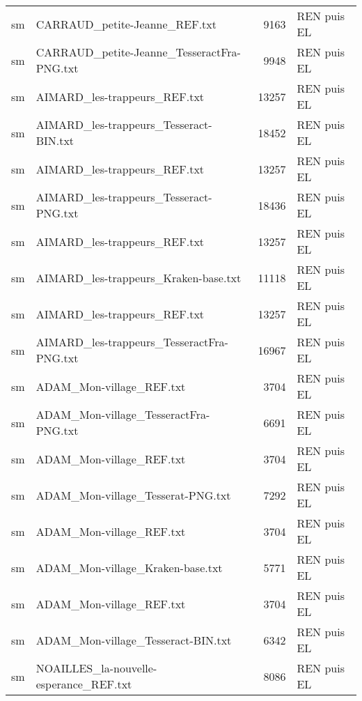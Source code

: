 \begin{tabular}{llrl}
    sm &                      CARRAUD\_petite-Jeanne\_REF.txt &                  9163 & REN puis EL \\
    sm &         CARRAUD\_petite-Jeanne\_TesseractFra-PNG.txt &                  9948 & REN puis EL \\
    sm &                       AIMARD\_les-trappeurs\_REF.txt &                 13257 & REN puis EL \\
    sm &             AIMARD\_les-trappeurs\_Tesseract-BIN.txt &                 18452 & REN puis EL \\
    sm &                       AIMARD\_les-trappeurs\_REF.txt &                 13257 & REN puis EL \\
    sm &             AIMARD\_les-trappeurs\_Tesseract-PNG.txt &                 18436 & REN puis EL \\
    sm &                       AIMARD\_les-trappeurs\_REF.txt &                 13257 & REN puis EL \\
    sm &               AIMARD\_les-trappeurs\_Kraken-base.txt &                 11118 & REN puis EL \\
    sm &                       AIMARD\_les-trappeurs\_REF.txt &                 13257 & REN puis EL \\
    sm &          AIMARD\_les-trappeurs\_TesseractFra-PNG.txt &                 16967 & REN puis EL \\
    sm &                           ADAM\_Mon-village\_REF.txt &                  3704 & REN puis EL \\
    sm &              ADAM\_Mon-village\_TesseractFra-PNG.txt &                  6691 & REN puis EL \\
    sm &                           ADAM\_Mon-village\_REF.txt &                  3704 & REN puis EL \\
    sm &                  ADAM\_Mon-village\_Tesserat-PNG.txt &                  7292 & REN puis EL \\
    sm &                           ADAM\_Mon-village\_REF.txt &                  3704 & REN puis EL \\
    sm &                   ADAM\_Mon-village\_Kraken-base.txt &                  5771 & REN puis EL \\
    sm &                           ADAM\_Mon-village\_REF.txt &                  3704 & REN puis EL \\
    sm &                 ADAM\_Mon-village\_Tesseract-BIN.txt &                  6342 & REN puis EL \\
    sm &             NOAILLES\_la-nouvelle-esperance\_REF.txt &                  8086 & REN puis EL \\

\end{tabular}

